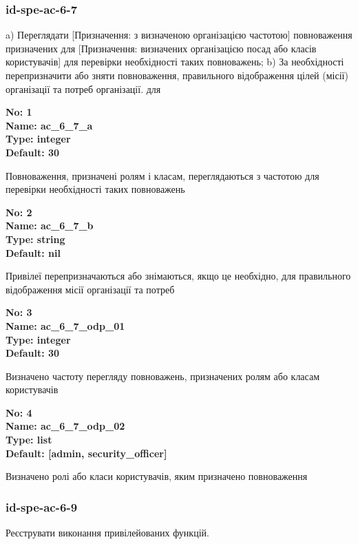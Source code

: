 \documentclass{article}
\begin{document}
\subsubsection{id-spe-ac-6-7}
a) Переглядати [Призначення: з визначеною організацією частотою] повноваження призначених для [Призначення: визначених організацією посад або класів користувачів] для перевірки необхідності таких повноважень; b) За необхідності перепризначити або зняти повноваження, правильного відображення цілей (місії) організації та потреб організації. для

\vspace{10pt}
{\footnotesize\bfseries
No: 1\\
Name: ac\_\allowbreak{}6\_\allowbreak{}7\_\allowbreak{}a\\
Type: integer\\
Default: 30
}

{\footnotesize Повноваження, призначені ролям і класам, переглядаються з частотою для перевірки необхідності таких повноважень}


{\footnotesize\bfseries
No: 2\\
Name: ac\_\allowbreak{}6\_\allowbreak{}7\_\allowbreak{}b\\
Type: string\\
Default: nil
}

{\footnotesize Привілеї перепризначаються або знімаються, якщо це необхідно, для правильного відображення місії організації та потреб}


{\footnotesize\bfseries
No: 3\\
Name: ac\_\allowbreak{}6\_\allowbreak{}7\_\allowbreak{}odp\_\allowbreak{}01\\
Type: integer\\
Default: 30
}

{\footnotesize Визначено частоту перегляду повноважень, призначених ролям або класам користувачів}


{\footnotesize\bfseries
No: 4\\
Name: ac\_\allowbreak{}6\_\allowbreak{}7\_\allowbreak{}odp\_\allowbreak{}02\\
Type: list\\
Default: [\textquotedbl{}admin\textquotedbl{}, \textquotedbl{}security\_\allowbreak{}officer\textquotedbl{}]
}

{\footnotesize Визначено ролі або класи користувачів, яким призначено повноваження }




\subsubsection{id-spe-ac-6-9}
Реєструвати виконання привілейованих функцій.
\end{document}

